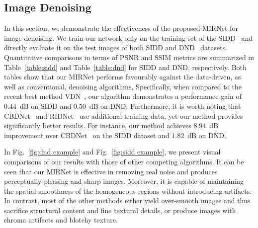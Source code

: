 \documentclass[runningheads]{llncs}
\begin{document}
\vspace{-0.4em}
\subsection{Image Denoising}
In this section, we demonstrate the effectiveness of the proposed MIRNet for image denoising.
We train our network only on the training set of the SIDD~\cite{sidd} and directly evaluate it on the test images of both SIDD and DND~\cite{dnd} datasets.
Quantitative comparisons in terms of PSNR and SSIM metrics are summarized in Table~\ref{table:sidd} and Table~\ref{table:dnd} for SIDD and DND, respectively.
Both tables show that our MIRNet performs favourably against the data-driven, as well as conventional, denoising algorithms. 
Specifically, when compared to the recent best method VDN~\cite{VDN}, our algorithm demonstrates a performance gain of $0.44$~dB on SIDD and $0.50$~dB on DND.  
Furthermore, it is worth noting that CBDNet~\cite{CBDNet} and RIDNet~\cite{RIDNet} use additional training data, yet our method provides significantly better results. For instance, our method achieves $8.94$~dB improvement over CBDNet~\cite{CBDNet} on the SIDD dataset and $1.82$~dB on DND. 




In Fig.~\ref{fig:dnd example} and Fig.~\ref{fig:sidd example}, we present visual comparisons of our results with those of other competing algorithms. 
It can be seen that our MIRNet is effective in removing real noise and produces perceptually-pleasing and sharp images.
Moreover, it is capable of maintaining the spatial smoothness of the homogeneous regions without introducing artifacts.
In contrast, most of the other methods either yield over-smooth images and thus sacrifice structural content and fine textural details, or produce images with chroma artifacts and blotchy texture.
\end{document}
